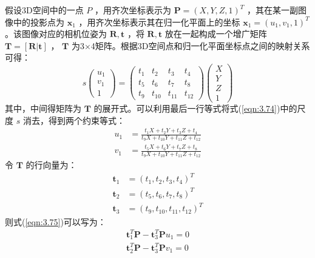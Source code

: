 假设3D空间中的一点 $P$ ，用齐次坐标表示为 $\boldsymbol{P}=(X, Y, Z, 1)^{T} $ ，其在某一副图像中的投影点为 $\boldsymbol{x}_{1}$ ，用齐次坐标表示其在归一化平面上的坐标 $\boldsymbol{x}_{1}=\left(u_{1}, v_{1}, 1\right)^{T} $ 。该图像对应的相机位姿为 $\boldsymbol{R}, \boldsymbol{t} $ ，将 $\boldsymbol{R}, \boldsymbol{t} $ 放在一起构成一个增广矩阵 $\boldsymbol{T}= [ \boldsymbol{R} | \boldsymbol{t}] $ ， $ \boldsymbol{T} $ 为3×4矩阵。根据3D空间点和归一化平面坐标点之间的映射关系可得：
\begin{equation}
\label{eqn:3.74}
s \left( \begin{array}{c}{u_{1}} \\ {v_{1}} \\ {1}\end{array}\right)=\left( \begin{array}{cccc}{t_{1}} & {t_{2}} & {t_{3}} & {t_{4}} \\ {t_{5}} & {t_{6}} & {t_{7}} & {t_{8}} \\ {t_{9}} & {t_{10}} & {t_{11}} & {t_{12}}\end{array}\right) \left( \begin{array}{c}{X} \\ {Y} \\ {Z} \\ {1}\end{array}\right)
\end{equation}
其中，中间得矩阵为 $ \boldsymbol{T} $ 的展开式。可以利用最后一行等式将式(\ref{eqn:3.74})中的尺度 $s$ 消去，得到两个约束等式：
\begin{equation}
\label{eqn:3.75}
\begin{aligned}
u_{1} &= \frac{t_{1} X+t_{2} Y+t_{3} Z+t_{4}}{t_{9} X+t_{10} Y+t_{11} Z+t_{12}} \\
v_{1} &= \frac{t_{5} X+t_{6} Y+t_{7} Z+t_{8}}{t_{9} X+t_{10} Y+t_{11} Z+t_{12}}
\end{aligned}
\end{equation}
令 $ \boldsymbol{T} $ 的行向量为：
\begin{equation}
\label{eqn:3.76}
\begin{aligned}
\boldsymbol{t} _{1} &= \left(t_{1}, t_{2}, t_{3}, t_{4}\right)^{T} \\
\boldsymbol{t} _{2} &= \left(t_{5}, t_{6}, t_{7}, t_{8}\right)^{T} \\
\boldsymbol{t} _{3} &= \left(t_{9}, t_{10}, t_{11}, t_{12}\right)^{T}
\end{aligned}
\end{equation}
则式(\ref{eqn:3.75})可以写为：
\begin{equation}
\label{eqn:3.77}
\begin{aligned}
\boldsymbol{t}_{1}^{T} \boldsymbol{P}-\boldsymbol{t}_{3}^{T} \boldsymbol{P} u_{1}=0 \\
\boldsymbol{t}_{2}^{T} \boldsymbol{P}-\boldsymbol{t}_{3}^{T} \boldsymbol{P} v_{1}=0
\end{aligned}
\end{equation}

